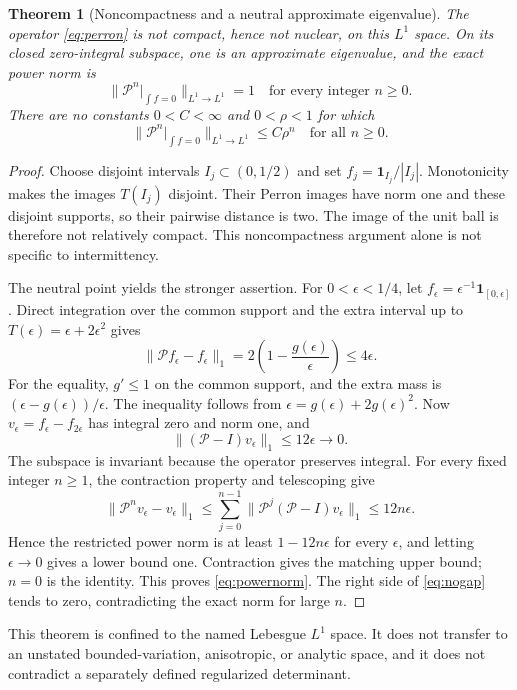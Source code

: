 \documentclass[10pt]{article}
\newcommand{\PP}{\mathcal P}
\newtheorem{theorem}{Theorem}
\begin{document}
\begin{theorem}[Noncompactness and a neutral approximate eigenvalue]
The operator \eqref{eq:perron} is not compact, hence not nuclear, on this
$L^1$ space. On its closed zero-integral subspace, one is an approximate
eigenvalue, and the exact power norm is
\begin{equation}
\|\PP^n|_{\int f=0}\|_{L^1\to L^1}=1
\quad\text{for every integer }n\ge0.
\label{eq:powernorm}
\end{equation}
There are no constants $0<C<\infty$ and $0<\rho<1$ for which
\begin{equation}
\|\PP^n|_{\int f=0}\|_{L^1\to L^1}\le C\rho^n
\quad\text{for all }n\ge0.
\label{eq:nogap}
\end{equation}
\end{theorem}
\begin{proof}
Choose disjoint intervals $I_j\subset(0,1/2)$ and set
$f_j=\mathbf1_{I_j}/|I_j|$. Monotonicity makes the images $T(I_j)$
disjoint. Their Perron images have norm one and these disjoint supports,
so their pairwise distance is two. The image of the unit ball is therefore
not relatively compact. This noncompactness argument alone is not specific
to intermittency.

The neutral point yields the stronger assertion. For $0<\epsilon<1/4$, let
$f_\epsilon=\epsilon^{-1}\mathbf1_{[0,\epsilon]}$. Direct integration over
the common support and the extra interval up to
$T(\epsilon)=\epsilon+2\epsilon^2$ gives
\begin{equation}
\|\PP f_\epsilon-f_\epsilon\|_1
=2\left(1-\frac{g(\epsilon)}\epsilon\right)\le4\epsilon.
\label{eq:approx}
\end{equation}
For the equality, $g'\le1$ on the common support, and the extra mass is
$(\epsilon-g(\epsilon))/\epsilon$. The inequality follows from
$\epsilon=g(\epsilon)+2g(\epsilon)^2$.
Now $v_\epsilon=f_\epsilon-f_{2\epsilon}$ has integral zero and norm one,
and
\begin{equation}
\|(\PP-I)v_\epsilon\|_1\le12\epsilon\longrightarrow0.
\label{eq:zerointegral}
\end{equation}
The subspace is invariant because the operator preserves integral.
For every fixed integer $n\ge1$, the contraction property and telescoping
give
\begin{equation}
\|\PP^n v_\epsilon-v_\epsilon\|_1
\le\sum_{j=0}^{n-1}\|\PP^j(\PP-I)v_\epsilon\|_1
\le12n\epsilon.
\label{eq:telescoping}
\end{equation}
Hence the restricted power norm is at least $1-12n\epsilon$ for every
$\epsilon$, and letting $\epsilon\to0$ gives a lower bound one.
Contraction gives the matching upper bound; $n=0$ is the identity.
This proves \eqref{eq:powernorm}. The right side of \eqref{eq:nogap} tends
to zero, contradicting the exact norm for large $n$.
\end{proof}
This theorem is confined to the named Lebesgue $L^1$ space. It does not
transfer to an unstated bounded-variation, anisotropic, or analytic space,
and it does not contradict a separately defined regularized determinant.
\end{document}

